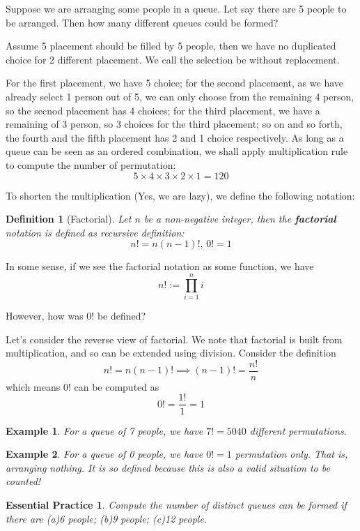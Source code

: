 \documentclass[12pt]{article}
\newtheorem{definition}{Definition}[section]
\newtheorem*{example}{Example}
\newtheorem{exercise}{Essential Practice}[subsection]
\begin{document}
    Suppose we are arranging some people in a queue. Let say there are 5 people to be arranged. Then how many different queues could be formed?

    Assume 5 placement should be filled by 5 people, then we have no duplicated choice for 2 different placement. We call the selection be without replacement.

    For the first placement, we have 5 choice; for the second placement, as we have already select 1 person out of 5, we can only choose from the remaining 4 person, so the secnod placement has 4 choices; for the third placement, we have a remaining of 3 person, so 3 choices for the third placement; so on and so forth, the fourth and the fifth placement has 2 and 1 choice respectively. As long as a queue can be seen as an ordered combination, we shall apply multiplication rule to compute the number of permutation: $$5\times 4\times 3\times 2\times 1 = 120$$

    To shorten the multiplication (Yes, we are lazy), we define the following notation:

    \begin{definition}[Factorial]
        Let $n$ be a non-negative integer, then the \textbf{factorial} notation is defined as recursive definition: $$n!=n(n-1)!, \, 0!=1$$
    \end{definition}

    In some sense, if we see the factorial notation as some function, we have $$n!:=\prod_{i=1}^n i$$

    However, how was $0!$ be defined?

    Let's consider the reverse view of factorial. We note that factorial is built from multiplication, and so can be extended using division. Consider the definition $$n!=n(n-1)! \implies (n-1)!=\frac{n!}{n}$$
    which means $0!$ can be computed as $$0!=\frac{1!}{1}=1$$

    \begin{example}
        For a queue of 7 people, we have $7!=5040$ different permutations.
    \end{example}

    \begin{example}
        For a queue of 0 people, we have $0!=1$ permutation only. That is, arranging nothing. It is so defined because this is also a valid situation to be counted!
    \end{example}

    \begin{exercise}
        Compute the number of distinct queues can be formed if there are (a)6 people; (b)9 people; (c)12 people.
    \end{exercise}
\end{document}
